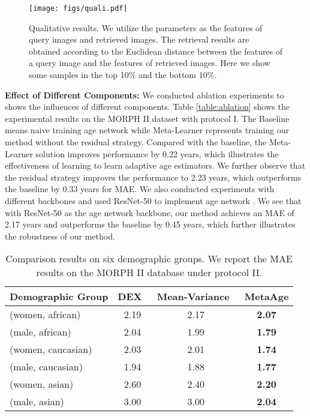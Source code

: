 \documentclass[journal,twoside]{IEEEtran}
\begin{document}
\begin{figure*}[t]
  \begin{center}
     \texttt{[image: figs/quali.pdf]}
  \end{center}
     \caption{Qualitative results. We utilize the parameters  as the features of query images and retrieved images. The retrieval results are obtained according to the Euclidean distance between the features of a query image and the features of retrieved images. Here we show some samples in the top 10\% and the bottom 10\%.}
  \label{fig:quali}
\end{figure*}


\textbf{Effect of Different Components:} We conducted ablation experiments to shows the influences of different components. Table \ref{table:ablation} shows the experimental results on the MORPH II dataset with protocol I. The Baseline means naive training age network  while Meta-Learner represents training our method without the residual strategy. Compared with the baseline, the Meta-Learner solution improves performance by 0.22 years, which illustrates the effectiveness of learning to learn adaptive age estimators. We further observe that the residual strategy improves the performance to 2.23 years, which outperforms the baseline by 0.33 years for MAE. We also conducted experiments with different backbones and used ResNet-50 to implement age network . We see that with ResNet-50 as the age network backbone, our method achieves an MAE of 2.17 years and outperforms the baseline by 0.45 years, which further illustrates the robustness of our method.



\begin{table}[t]
  \caption{Comparison results on six demographic groups. We report the MAE results on the MORPH II database under protocol II.}
  \centering
  \begin{tabular}{lccc}
  \toprule
  Demographic Group  & DEX~\cite{rothe2018deep}  & Mean-Variance~\cite{pan2018mean}  & MetaAge \\
  \midrule
  (women, african) & 2.19 & 2.17 & \textbf{2.07} \\
  (male, african) & 2.04 & 1.99 & \textbf{1.79} \\
  (women, caucasian) & 2.03 & 2.01 & \textbf{1.74} \\
  (male, caucasian) & 1.94 & 1.88 & \textbf{1.77} \\
  (women, asian) & 2.60 & 2.40 & \textbf{2.20} \\
  (male, asian) & 3.00 & 3.00 & \textbf{2.04} \\
  \bottomrule
  \end{tabular}
  \label{table:attributeour}
\end{table}
  
\end{document}
